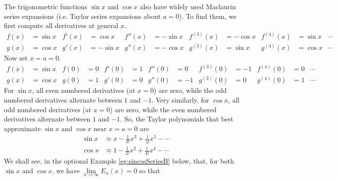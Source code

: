 \begin{eg}\label{eg:sincosSeries}
The trigonometric functions $\sin x$ and $\cos x$ also have widely used
Maclaurin series expansions (i.e. Taylor series expansions about $a=0$).
To find them, we first compute all derivatives at general $x$.
\begin{equation*}%
\begin{aligned}
f(x)&=\sin x &
f'(x)&=\cos x &
f''(x)&=-\sin x &
f^{(3)}(x)&=-\cos x &
f^{(4)}(x)&=\sin x & \cdots\\
g(x)&=\cos x &
g'(x)&=-\sin x &
g''(x)&=-\cos x &
g^{(3)}(x)&=\sin x &
g^{(4)}(x)&=\cos x & \cdots
\end{aligned}
\end{equation*}
%
Now set $x=a=0$.
\begin{equation*}%
\begin{aligned}
f(x)&=\sin x &
f(0)&=0 &
f'(0)&=1 &
f''(0)&=0 &
f^{(3)}(0)&=-1 &
f^{(4)}(0)&=0 & \cdots\\
g(x)&=\cos x &
g(0)&=1 &
g'(0)&=0 &
g''(0)&=-1 &
g^{(3)}(0)&=0 &
g^{(4)}(0)&=1 & \cdots
\end{aligned}
\end{equation*}
For $\sin x$, all even numbered derivatives (at $x=0$) are zero,
while the odd numbered derivatives alternate between $1$ and $-1$.
Very similarly, for $\cos x$, all odd numbered derivatives (at $x=0$) are zero,
while the even numbered derivatives alternate between $1$ and $-1$.
So, the Taylor polynomials that best approximate $\sin x$ and $\cos x$
near $x=a=0$ are
\begin{align*}
\sin x &\approx x-\tfrac{1}{3!}x^3+\tfrac{1}{5!}x^5-\cdots\\
\cos x &\approx 1-\tfrac{1}{2!}x^2+\tfrac{1}{4!}x^4-\cdots
\end{align*}
We shall see, in the optional Example \ref{eg:sincosSeriesB}
below, that, for both $\sin x$ and $\cos x$,
we have $\lim\limits_{n\rightarrow\infty}E_n(x)=0$ so that

\end{eg}
